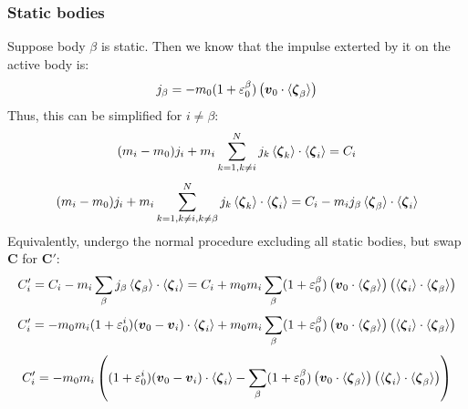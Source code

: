 \documentclass[10pt]{report}
\begin{document}
\subsubsection{Static bodies}
Suppose body $\beta$ is static. Then we know that the impulse exterted by it on the active body is:
\begin{equation}j_\beta=-m_0(1+\varepsilon_0^\beta)\left(\boldsymbol{v}_0\cdot\braket{\boldsymbol{\zeta}_\beta}\right)\end{equation}
Thus, this can be simplified for $i\neq\beta$:
\begin{equation}(m_i-m_0)j_i+m_i\sum_{k=1,k\neq i}^Nj_k\braket{\boldsymbol{\zeta}_k}\cdot\braket{\boldsymbol{\zeta}_i}=C_i\end{equation}
\begin{equation}(m_i-m_0)j_i+m_i\sum_{k=1,k\neq i,k\neq\beta}^Nj_k\braket{\boldsymbol{\zeta}_k}\cdot\braket{\boldsymbol{\zeta}_i}=C_i-m_ij_\beta\braket{\boldsymbol{\zeta}_\beta}\cdot\braket{\boldsymbol{\zeta}_i}\end{equation}
Equivalently, undergo the normal procedure excluding all static bodies, but swap $\boldsymbol{C}$ for $\boldsymbol{C}'$:
\begin{equation}C_i'=C_i-m_i\sum_\beta j_\beta\braket{\boldsymbol{\zeta}_\beta}\cdot\braket{\boldsymbol{\zeta}_i}=C_i+m_0m_i\sum_\beta(1+\varepsilon_0^\beta)\left(\boldsymbol{v}_0\cdot\braket{\boldsymbol{\zeta}_\beta}\right)\left(\braket{\boldsymbol{\zeta}_i}\cdot\braket{\boldsymbol{\zeta}_\beta}\right)\end{equation}
\begin{equation}C_i'=-m_0m_i(1+\varepsilon_0^i)(\boldsymbol{v}_0-\boldsymbol{v}_i)\cdot\braket{\boldsymbol{\zeta}_i}+m_0m_i\sum_\beta(1+\varepsilon_0^\beta)\left(\boldsymbol{v}_0\cdot\braket{\boldsymbol{\zeta}_\beta}\right)\left(\braket{\boldsymbol{\zeta}_i}\cdot\braket{\boldsymbol{\zeta}_\beta}\right)\end{equation}
\begin{equation}C_i'=-m_0m_i\left((1+\varepsilon_0^i)(\boldsymbol{v}_0-\boldsymbol{v}_i)\cdot\braket{\boldsymbol{\zeta}_i}-\sum_\beta(1+\varepsilon_0^\beta)\left(\boldsymbol{v}_0\cdot\braket{\boldsymbol{\zeta}_\beta}\right)\left(\braket{\boldsymbol{\zeta}_i}\cdot\braket{\boldsymbol{\zeta}_\beta}\right)\right)\end{equation}
\end{document}
